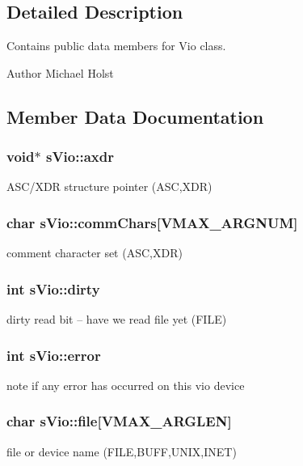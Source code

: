 \subsection{Detailed Description}
Contains public data members for Vio class. 

\begin{DoxyAuthor}{Author}
Michael Holst 
\end{DoxyAuthor}


\subsection{Member Data Documentation}
\subsubsection[{axdr}]{\setlength{\rightskip}{0pt plus 5cm}void$\ast$ s\+Vio\+::axdr}\label{a00002_acdd32890033cf340b8749afe256647f9}
A\+S\+C/\+X\+D\+R structure pointer (A\+S\+C,X\+D\+R) 
\subsubsection[{comm\+Chars}]{\setlength{\rightskip}{0pt plus 5cm}char s\+Vio\+::comm\+Chars[{\bf V\+M\+A\+X\+\_\+\+A\+R\+G\+N\+U\+M}]}\label{a00002_a58c30e0df43f9853024a3d617f62ee33}
comment character set (A\+S\+C,X\+D\+R) 
\subsubsection[{dirty}]{\setlength{\rightskip}{0pt plus 5cm}int s\+Vio\+::dirty}\label{a00002_a72fb31f8402b0529548f19d2fef80dc6}
dirty read bit -- have we read file yet (F\+I\+L\+E) 
\subsubsection[{error}]{\setlength{\rightskip}{0pt plus 5cm}int s\+Vio\+::error}\label{a00002_af77cb7bb4dafab6b485a881732e7b8f9}
note if any error has occurred on this vio device 
\subsubsection[{file}]{\setlength{\rightskip}{0pt plus 5cm}char s\+Vio\+::file[{\bf V\+M\+A\+X\+\_\+\+A\+R\+G\+L\+E\+N}]}\label{a00002_ab8b3817815f2c248fb0e781944a43b17}
file or device name (F\+I\+L\+E,B\+U\+F\+F,U\+N\+I\+X,I\+N\+E\+T) 
